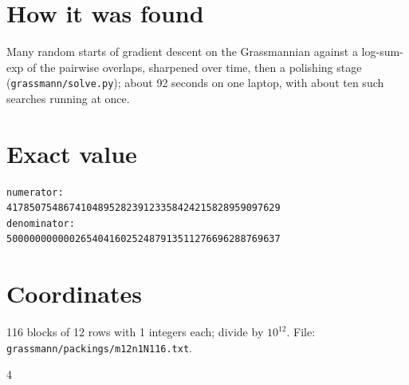 \documentclass[11pt,a4paper]{article}
\begin{document}
\section{How it was found}
Many random starts of gradient descent on the Grassmannian against a log-sum-exp of the pairwise overlaps, sharpened over time, then a polishing stage (\texttt{grassmann/solve.py}); about 92 seconds on one laptop, with about ten such searches running at once.


\appendix
\section{Exact value}
{\small
\begin{verbatim}
numerator:
417850754867410489528239123358424215828959097629
denominator:
500000000000265404160252487913511276696288769637
\end{verbatim}}

\section{Coordinates}
116 blocks of 12 rows with 1 integers each; divide by $10^{12}$. File: \texttt{grassmann/packings/m12n1N116.txt}.
{\tiny
\begin{multicols}{4}
\end{multicols}}
\end{document}
